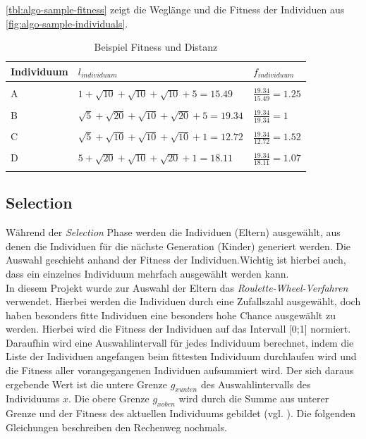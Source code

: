 \documentclass[12pt,a4paper]{scrreprt}
\begin{document}
\autoref{tbl:algo-sample-fitness} zeigt die Weglänge und die Fitness der Individuen aus \autoref{fig:algo-sample-individuals}.

\begin{center}
\begin{longtable}{p{2.5cm} | p{6.5cm} | p{3.0cm}}
Individuum & $l_{individuum}$ & $f_{individuum}$ \\
\hline & & \\
A & $1 + \sqrt{10} + \sqrt{10} + \sqrt{10} + 5 = 15.49$ & $\frac{19.34}{15.49} = 1.25$ \\
& & \\
B & $\sqrt{5} + \sqrt{20} + \sqrt{10} + \sqrt{20} + 5 = 19.34$ & $\frac{19.34}{19.34} = 1$ \\
& & \\
C & $\sqrt{5} + \sqrt{10} + \sqrt{10} + \sqrt{10} + 1 = 12.72$ & $\frac{19.34}{12.72} = 1.52$ \\
& & \\
D & $5 + \sqrt{20} + \sqrt{10} + \sqrt{20} + 1 = 18.11$ & $\frac{19.34}{18.11} = 1.07$\\

\caption{Beispiel Fitness und Distanz}
\label{tbl:algo-sample-fitness}
\end{longtable}
\end{center}

\subsection{Selection}
\label{subsec:selection}

Während der \textit{Selection} Phase werden die Individuen (Eltern) ausgewählt, aus denen die Individuen für die nächste Generation (Kinder) generiert werden. Die Auswahl geschieht anhand der Fitness der Individuen.Wichtig ist hierbei auch, dass ein einzelnes Individuum mehrfach ausgewählt werden kann.\\
In diesem Projekt wurde zur Auswahl der Eltern das \textit{Roulette-Wheel-Verfahren} verwendet. Hierbei werden die Individuen durch eine Zufallszahl ausgewählt, doch haben besonders fitte Individuen eine besonders hohe Chance ausgewählt zu werden. Hierbei wird die Fitness der Individuen auf das Intervall [0;1] normiert. Daraufhin wird eine Auswahlintervall für jedes Individuum berechnet, indem die Liste der Individuen angefangen beim fittesten Individuum durchlaufen wird und die Fitness aller vorangegangenen Individuen aufsummiert wird. Der sich daraus ergebende Wert ist die untere Grenze $g_{x unten}$ des Auswahlintervalls des Individuums $x$. Die obere Grenze $g_{x oben}$ wird durch die Summe aus unterer Grenze und der Fitness des aktuellen Individuums gebildet (vgl. \cite{rongqu14}). Die folgenden Gleichungen beschreiben den Rechenweg nochmals.
\end{document}
